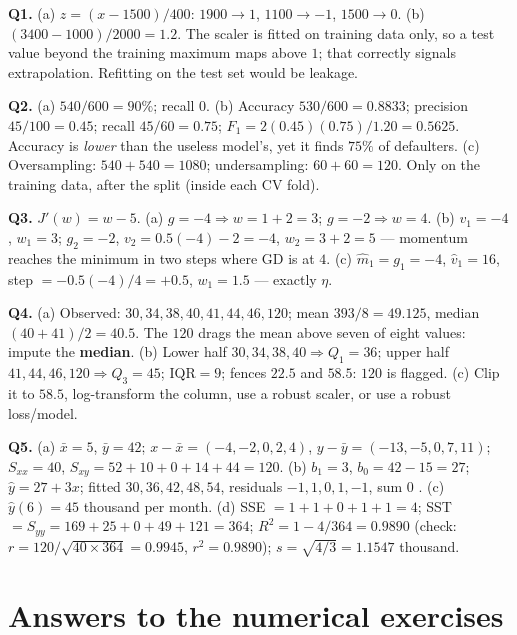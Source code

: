 \documentclass[11pt]{article}
\newcommand{\IQR}{\mathrm{IQR}}
\begin{document}
\begin{worked}
\textbf{Q1.} (a) $z = (x - 1500)/400$: $1900 \to 1$, $1100 \to -1$,
$1500 \to 0$. (b) $(3400 - 1000)/2000 = 1.2$. The scaler is fitted on
training data only, so a test value beyond the training maximum maps above
$1$; that correctly signals extrapolation. Refitting on the test set would be
leakage.

\textbf{Q2.} (a) $540/600 = 90\%$; recall $0$. (b) Accuracy $530/600 =
0.8833$; precision $45/100 = 0.45$; recall $45/60 = 0.75$; $F_1 =
2(0.45)(0.75)/1.20 = 0.5625$. Accuracy is \emph{lower} than the useless
model's, yet it finds $75\%$ of defaulters. (c) Oversampling: $540 + 540 =
1080$; undersampling: $60 + 60 = 120$. Only on the training data, after the
split (inside each CV fold).

\textbf{Q3.} $J'(w) = w - 5$. (a) $g = -4 \Rightarrow w = 1 + 2 = 3$;
$g = -2 \Rightarrow w = 4$. (b) $v_1 = -4$, $w_1 = 3$; $g_2 = -2$,
$v_2 = 0.5(-4) - 2 = -4$, $w_2 = 3 + 2 = 5$ --- momentum reaches the minimum
in two steps where GD is at $4$. (c) $\hat m_1 = g_1 = -4$, $\hat v_1 = 16$,
step $= -0.5(-4)/4 = +0.5$, $w_1 = 1.5$ --- exactly $\eta$.

\textbf{Q4.} (a) Observed: $30, 34, 38, 40, 41, 44, 46, 120$; mean
$393/8 = 49.125$, median $(40 + 41)/2 = 40.5$. The $120$ drags the mean above
seven of eight values: impute the \textbf{median}. (b) Lower half $30, 34, 38,
40 \Rightarrow Q_1 = 36$; upper half $41, 44, 46, 120 \Rightarrow Q_3 = 45$;
$\IQR = 9$; fences $22.5$ and $58.5$: $120$ is flagged. (c) Clip it to $58.5$,
log-transform the column, use a robust scaler, or use a robust loss/model.

\textbf{Q5.} (a) $\bar x = 5$, $\bar y = 42$; $x - \bar x = (-4,-2,0,2,4)$,
$y - \bar y = (-13,-5,0,7,11)$; $S_{xx} = 40$, $S_{xy} = 52 + 10 + 0 + 14 + 44
= 120$. (b) $b_1 = 3$, $b_0 = 42 - 15 = 27$; $\hat y = 27 + 3x$; fitted
$30, 36, 42, 48, 54$, residuals $-1, 1, 0, 1, -1$, sum $0$ \checkmark.
(c) $\hat y(6) = 45$ thousand per month.
(d) SSE $= 1 + 1 + 0 + 1 + 1 = 4$; SST $= S_{yy} = 169 + 25 + 0 + 49 + 121 =
364$; $R^2 = 1 - 4/364 = 0.9890$ (check: $r = 120/\sqrt{40 \times 364} =
0.9945$, $r^2 = 0.9890$); $s = \sqrt{4/3} = 1.1547$ thousand.
\end{worked}
\section{Answers to the numerical exercises}
\label{sec:answers}
\end{document}
